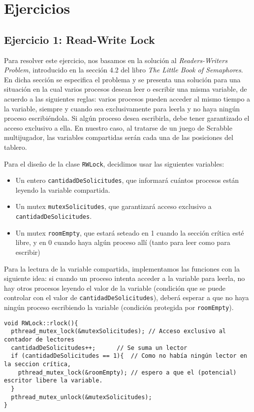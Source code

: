 \section{Ejercicios}

\subsection{Ejercicio 1: Read-Write Lock}
Para resolver este ejercicio, nos basamos en la soluci\'on al \textit{Readers-Writers Problem}, introducido en la secci\'on 4.2 del libro 
\textit{The Little Book of Semaphores}. En dicha secci\'on se especifica el problema y se presenta una soluci\'on para una situaci\'on en la 
cual varios procesos desean leer o escribir una misma variable, de acuerdo a las siguientes reglas: varios procesos pueden acceder al mismo tiempo a la 
variable, siempre y cuando sea exclusivamente para leerla y no haya ning\'un proceso escribi\'endola. Si alg\'un proceso desea escribirla, 
debe tener garantizado el acceso exclusivo a ella. En nuestro caso, al tratarse de un juego de Scrabble multijugador, las variables compartidas ser\'an 
cada una de las posiciones del tablero.

Para el dise\~no de la clase \verb|RWLock|, decidimos usar las siguientes variables:

\begin{itemize}
 \item Un entero \verb|cantidadDeSolicitudes|, que informar\'a cu\'antos procesos est\'an leyendo la variable compartida.
 \item Un mutex \verb|mutexSolicitudes|, que garantizar\'a acceso exclusivo a \verb|cantidadDeSolicitudes|.
 \item Un mutex \verb|roomEmpty|, que estar\'a seteado en 1 cuando la secci\'on cr\'itica est\'e libre, y en 0 cuando haya alg\'un proceso all\'i (tanto
 para leer como para escribir)
\end{itemize}

Para la lectura de la variable compartida, implementamos las funciones con la siguiente idea: si cuando un proceso intenta acceder a la variable para leerla,
no hay otros procesos leyendo el valor de la variable (condici\'on que se puede controlar con el valor de \verb|cantidadDeSolicitudes|), deber\'a esperar
a que no haya ning\'un proceso escribiendo la variable (condici\'on protegida por \verb|roomEmpty|). 

\begin{verbatim}
void RWLock::rlock(){
  pthread_mutex_lock(&mutexSolicitudes); // Acceso exclusivo al contador de lectores
  cantidadDeSolicitudes++;		// Se suma un lector
  if (cantidadDeSolicitudes == 1){	// Como no había ningún lector en la seccion crítica,
    pthread_mutex_lock(&roomEmpty);	// espero a que el (potencial) escritor libere la variable.
  }
  pthread_mutex_unlock(&mutexSolicitudes);
}
\end{verbatim}

